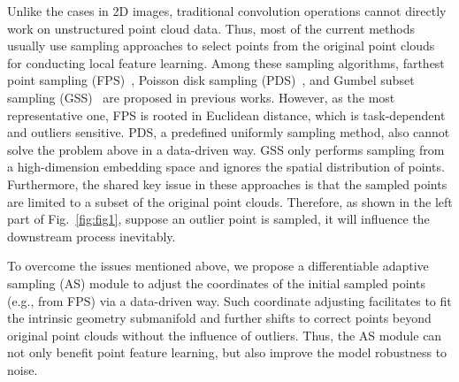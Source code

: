 \documentclass[10pt,twocolumn,letterpaper]{article}
\begin{document}
	Unlike the cases in 2D images, traditional convolution operations cannot directly work on unstructured point cloud data. Thus, most of the current methods usually use sampling approaches to select points from the original point clouds for conducting local feature learning. Among these sampling algorithms, farthest point sampling (FPS)~\cite{pointnet2}, Poisson disk sampling (PDS)~\cite{Monte}, and Gumbel subset sampling (GSS)~\cite{Gumbel} are proposed in previous works. However, as the most representative one, FPS is rooted in Euclidean distance, which is task-dependent and outliers sensitive. PDS, a predefined uniformly sampling method, also cannot solve the problem above in a data-driven way. GSS only performs sampling from a high-dimension embedding space and ignores the spatial distribution of points. Furthermore, the shared key issue in these approaches is that the sampled points are limited to a subset of the original point clouds. Therefore, as shown in the left part of Fig.~\ref{fig:fig1}, suppose an outlier point is sampled, it will influence the downstream process inevitably.
	
	To overcome the issues mentioned above, we propose a differentiable adaptive sampling (AS) module to adjust the coordinates of the initial sampled points (e.g., from FPS) via a data-driven way. Such coordinate adjusting facilitates to fit the intrinsic geometry submanifold and further shifts to correct points beyond original point clouds without the influence of outliers. Thus, the AS module can not only benefit point feature learning, but also improve the model robustness to noise.
	
	
\end{document}
